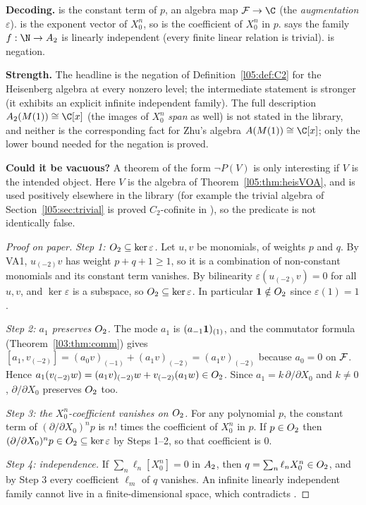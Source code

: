 \begin{dictionary}
\textbf{Decoding.}  is the constant term of $p$, an algebra map
$\lfiveF\to\C$ (the \emph{augmentation} $\varepsilon$).  is the exponent vector of
$X_0^n$, so  is the coefficient of $X_0^n$ in $p$.
 says the family $f:\N\to\lfiveA$ is linearly independent (every finite linear
relation is trivial).  is negation.

\textbf{Strength.} The headline is the negation of Definition~\ref{l05:def:C2} for the Heisenberg algebra at
every nonzero level; the intermediate statement  is stronger
(it exhibits an explicit infinite independent family). The full description $\lfiveA(M(1))\cong\C[x]$ (the
images of $X_0^n$ \emph{span} as well) is not stated in the library, and neither is the corresponding fact for
Zhu's algebra $A(M(1))\cong\C[x]$; only the lower bound needed for the negation is proved.

\textbf{Could it be vacuous?} A theorem of the form $\neg P(V)$ is only interesting if $V$ is the intended
object. Here $V$ is the algebra of Theorem~\ref{l05:thm:heisVOA}, and  is used positively
elsewhere in the library (for example the trivial algebra of Section~\ref{l05:sec:trivial} is proved
$C_2$-cofinite in ), so the predicate is not identically false.
\end{dictionary}

\begin{proof}[Proof on paper]
\emph{Step 1: $O_2\subseteq\ker\varepsilon$.} Let $u,v$ be monomials, of weights $p$ and $q$. By VA1,
$u_{(-2)}v$ has weight $p+q+1\ge1$, so it is a combination of non-constant monomials and its constant term
vanishes. By bilinearity $\varepsilon(u_{(-2)}v)=0$ for all $u,v$, and $\ker\varepsilon$ is a subspace, so
$O_2\subseteq\ker\varepsilon$. In particular $\mathbf{1}\notin O_2$ since $\varepsilon(1)=1$.

\emph{Step 2: $a_1$ preserves $O_2$.} The mode $a_1$ is $(a_{-1}\mathbf{1})_{(1)}$, and the commutator
formula (Theorem~\ref{l03:thm:comm}) gives
$[a_1,v_{(-2)}]=(a_0v)_{(-1)}+(a_1v)_{(-2)}=(a_1v)_{(-2)}$ because $a_0=0$ on $\mathcal{F}$. Hence
$a_1(v_{(-2)}w)=(a_1v)_{(-2)}w+v_{(-2)}(a_1w)\in O_2$. Since $a_1=k\,\partial/\partial X_0$ and $k\ne0$,
$\partial/\partial X_0$ preserves $O_2$ too.

\emph{Step 3: the $X_0^n$-coefficient vanishes on $O_2$.} For any polynomial $p$, the constant term of
$(\partial/\partial X_0)^np$ is $n!$ times the coefficient of $X_0^n$ in $p$. If $p\in O_2$ then
$(\partial/\partial X_0)^np\in O_2\subseteq\ker\varepsilon$ by Steps 1--2, so that coefficient is $0$.

\emph{Step 4: independence.} If $\sum_n\ell_n[X_0^n]=0$ in $A_2$, then $q=\sum_n\ell_nX_0^n\in O_2$, and
by Step 3 every coefficient $\ell_m$ of $q$ vanishes. An infinite linearly independent family cannot live in a
finite-dimensional space, which contradicts .
\end{proof}

